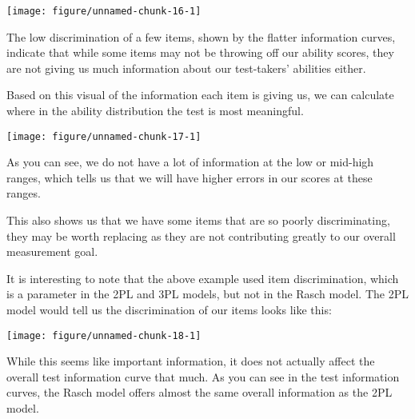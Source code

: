 \documentclass{article}\usepackage[]{graphicx}\usepackage[]{color}
\makeatletter
\newenvironment{kframe}{%
 \def\at@end@of@kframe{}%
 \ifinner\ifhmode%
  \def\at@end@of@kframe{\end{minipage}}%
  \begin{minipage}{\columnwidth}%
 \fi\fi%
 \def\FrameCommand##1{\hskip\@totalleftmargin \hskip-\fboxsep
 \colorbox{shadecolor}{##1}\hskip-\fboxsep
     \hskip-\linewidth \hskip-\@totalleftmargin \hskip\columnwidth}%
 \MakeFramed {\advance\hsize-\width
   \@totalleftmargin\z@ \linewidth\hsize
   \@setminipage}}%
 {\par\unskip\endMakeFramed%
 \at@end@of@kframe}
\newenvironment{knitrout}{}{} %
\makeatother
\begin{document}
\begin{enumerate}
\begin{knitrout}
{\centering \texttt{[image: figure/unnamed-chunk-16-1]} 

}



\end{knitrout}
\raggedright
The low discrimination of a few items, shown by the flatter information curves, indicate that while some items may not be throwing off our ability scores, they are not giving us much information about our test-takers' abilities either.
\raggedright

Based on this visual of the information each item is giving us, we can calculate where in the ability distribution the test is most meaningful.

\centering
\begin{knitrout}
\color{fgcolor}

{\centering \texttt{[image: figure/unnamed-chunk-17-1]} 

}



\end{knitrout}
\raggedright
As you can see, we do not have a lot of information at the low or mid-high ranges, which tells us that we will have higher errors in our scores at these ranges.
\raggedright

This also shows us that we have some items that are so poorly discriminating, they may be worth replacing as they are not contributing greatly to our overall measurement goal.
\raggedright

It is interesting to note that the above example used item discrimination, which is a parameter in the 2PL and 3PL models, but not in the Rasch model. The 2PL model would tell us the discrimination of our items looks like this:

\centering
\begin{knitrout}
\color{fgcolor}\begin{kframe}


{\ttfamily\noindent\itshape\color{messagecolor}{\#\# EM cycles terminated after 500 iterations.}}\end{kframe}

{\centering \texttt{[image: figure/unnamed-chunk-18-1]} 

}



\end{knitrout}
\raggedright
While this seems like important information, it does not actually affect the overall test information curve that much. As you can see in the test information curves, the Rasch model offers almost the same overall information as the 2PL model.


\end{enumerate}
\end{document}
